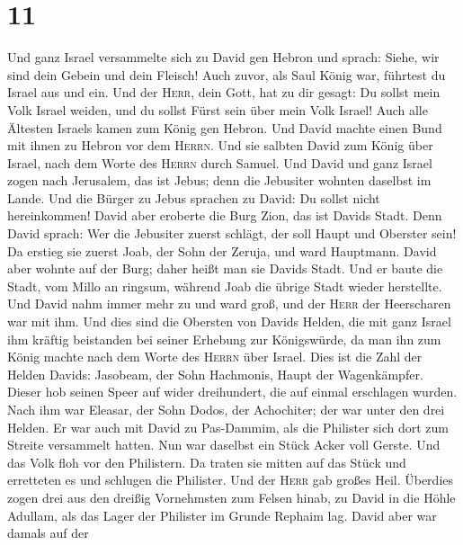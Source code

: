 \hypertarget{section-10}{%
\section{11}\label{section-10}}

 Und ganz Israel versammelte sich zu David gen Hebron und
sprach: Siehe, wir sind dein Gebein und dein Fleisch! 
Auch zuvor, als Saul König war, führtest du Israel aus und ein. Und der
\textsc{Herr}, dein Gott, hat zu dir gesagt: Du sollst mein Volk Israel
weiden, und du sollst Fürst sein über mein Volk Israel! 
Auch alle Ältesten Israels kamen zum König gen Hebron. Und David machte
einen Bund mit ihnen zu Hebron vor dem \textsc{Herrn}. Und sie salbten
David zum König über Israel, nach dem Worte des \textsc{Herrn} durch
Samuel.  Und David und ganz Israel zogen nach Jerusalem,
das ist Jebus; denn die Jebusiter wohnten daselbst im Lande.
 Und die Bürger zu Jebus sprachen zu David: Du sollst
nicht hereinkommen! David aber eroberte die Burg Zion, das ist Davids
Stadt.  Denn David sprach: Wer die Jebusiter zuerst
schlägt, der soll Haupt und Oberster sein! Da erstieg sie zuerst Joab,
der Sohn der Zeruja, und ward Hauptmann.  David aber
wohnte auf der Burg; daher heißt man sie Davids Stadt. 
Und er baute die Stadt, vom Millo an ringsum, während Joab die übrige
Stadt wieder herstellte.  Und David nahm immer mehr zu und
ward groß, und der \textsc{Herr} der Heerscharen war mit ihm.
 Und dies sind die Obersten von Davids Helden, die mit
ganz Israel ihm kräftig beistanden bei seiner Erhebung zur Königswürde,
da man ihn zum König machte nach dem Worte des \textsc{Herrn} über
Israel.  Dies ist die Zahl der Helden Davids: Jasobeam,
der Sohn Hachmonis, Haupt der Wagenkämpfer. Dieser hob seinen Speer auf
wider dreihundert, die auf einmal erschlagen wurden. 
Nach ihm war Eleasar, der Sohn Dodos, der Achochiter; der war unter den
drei Helden.  Er war auch mit David zu Pas-Dammim, als
die Philister sich dort zum Streite versammelt hatten. Nun war daselbst
ein Stück Acker voll Gerste. Und das Volk floh vor den Philistern.
 Da traten sie mitten auf das Stück und erretteten es und
schlugen die Philister. Und der \textsc{Herr} gab großes Heil.
 Überdies zogen drei aus den dreißig Vornehmsten zum
Felsen hinab, zu David in die Höhle Adullam, als das Lager der Philister
im Grunde Rephaim lag.  David aber war damals auf der
